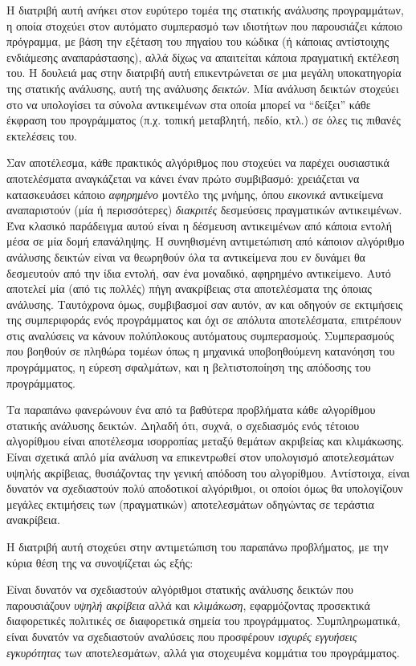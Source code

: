 Η διατριβή αυτή ανήκει στον ευρύτερο τομέα της στατικής ανάλυσης προγραμμάτων, η οποία στοχεύει στον αυτόματο συμπερασμό των ιδιοτήτων που παρουσιάζει κάποιο πρόγραμμα, με βάση την εξέταση του πηγαίου του κώδικα (ή κάποιας αντίστοιχης ενδιάμεσης αναπαράστασης), αλλά δίχως να απαιτείται κάποια πραγματική εκτέλεση του. Η δουλειά μας στην διατριβή αυτή επικεντρώνεται σε μια μεγάλη υποκατηγορία της στατικής ανάλυσης, αυτή της ανάλυσης \emph{δεικτών}. Μία ανάλυση δεικτών στοχεύει στο να υπολογίσει τα σύνολα αντικειμένων στα οποία μπορεί να ``δείξει'' κάθε έκφραση του προγράμματος (π.χ. τοπική μεταβλητή, πεδίο, κτλ.) σε όλες τις πιθανές εκτελέσεις του.

Σαν αποτέλεσμα, κάθε πρακτικός αλγόριθμος που στοχεύει να παρέχει ουσιαστικά αποτελέσματα αναγκάζεται να κάνει έναν πρώτο συμβιβασμό: χρειάζεται να κατασκευάσει κάποιο \emph{αφηρημένο} μοντέλο της μνήμης, όπου \emph{εικονικά} αντικείμενα αναπαριστούν (μία ή περισσότερες) \emph{διακριτές} δεσμεύσεις πραγματικών αντικειμένων. Ένα κλασικό παράδειγμα αυτού είναι η δέσμευση αντικειμένων από κάποια εντολή μέσα σε μία δομή επανάληψης. Η συνηθισμένη αντιμετώπιση από κάποιον αλγόριθμο ανάλυσης δεικτών είναι να θεωρηθούν όλα τα αντικείμενα που εν δυνάμει θα δεσμευτούν από την ίδια εντολή, σαν ένα μοναδικό, αφηρημένο αντικείμενο. Αυτό αποτελεί μία (από τις πολλές) πήγη ανακρίβειας στα αποτελέσματα της όποιας ανάλυσης. Ταυτόχρονα όμως, συμβιβασμοί σαν αυτόν, αν και οδηγούν σε εκτιμήσεις της συμπεριφοράς ενός προγράμματος και όχι σε απόλυτα αποτελέσματα, επιτρέπουν στις αναλύσεις να κάνουν πολύπλοκους αυτόματους συμπερασμούς. Συμπερασμούς που βοηθούν σε πληθώρα τομέων όπως η μηχανικά υποβοηθούμενη κατανόηση του προγράμματος, η εύρεση σφαλμάτων, και η βελτιστοποίηση της απόδοσης του προγράμματος.

Τα παραπάνω φανερώνουν ένα από τα βαθύτερα προβλήματα κάθε αλγορίθμου στατικής ανάλυσης δεικτών. Δηλαδή ότι, συχνά, ο σχεδιασμός ενός τέτοιου αλγορίθμου είναι αποτέλεσμα ισορροπίας μεταξύ θεμάτων ακριβείας και κλιμάκωσης. Είναι σχετικά απλό μία ανάλυση να επικεντρωθεί στον υπολογισμό αποτελεσμάτων υψηλής ακρίβειας, θυσιάζοντας την γενική απόδοση του αλγορίθμου. Αντίστοιχα, είναι δυνατόν να σχεδιαστούν πολύ αποδοτικοί αλγόριθμοι, οι οποίοι όμως θα υπολογίζουν μεγάλες εκτιμήσεις των (πραγματικών) αποτελεσμάτων οδηγώντας σε τεράστια ανακρίβεια.

Η διατριβή αυτή στοχεύει στην αντιμετώπιση του παραπάνω προβλήματος, με την κύρια θέση της να συνοψίζεται ώς εξής:

\begin{displayquote}
Είναι δυνατόν να σχεδιαστούν αλγόριθμοι στατικής ανάλυσης δεικτών που παρουσιάζουν \emph{υψηλή ακρίβεια} αλλά και \emph{κλιμάκωση}, εφαρμόζοντας προσεκτικά διαφορετικές πολιτικές σε διαφορετικά σημεία του προγράμματος. Συμπληρωματικά, είναι δυνατόν να σχεδιαστούν αναλύσεις που προσφέρουν \emph{ισχυρές εγγυήσεις εγκυρότητας} των αποτελεσμάτων, αλλά για στοχευμένα κομμάτια του προγράμματος.
\end{displayquote}

